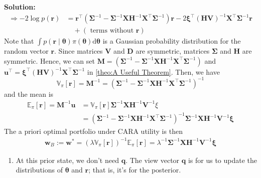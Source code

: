 \documentclass[13pt]{article}
\theoremstyle{definition}
\newenvironment{solution}
{\color{C2}\begin{framed}\begingroup\textbf{Solution:} }
  {\endgroup\end{framed}}
\theoremstyle{remark}
\newenvironment{remark}
  {\pushQED{\qed}\renewcommand{\qedsymbol}{$\triangle$}\remarkx}
  {\popQED\endremarkx}
\begin{document}
\begin{solution}
\begin{align*}
\Longrightarrow -2\log p(\bm{r}) &= \bm{r}^\top \left(\mathbf{\Sigma}^{-1} - \mathbf{\Sigma}^{-1} \mathbf{X} \mathbf{H}^{-1} \mathbf{X}^{\top} \mathbf{\Sigma}^{-1}\right) \boldsymbol{r}-2 \boldsymbol{\xi}^{\top}(\mathbf{H} \boldsymbol{V})^{-1} \mathbf{X}^{\top} \mathbf{\Sigma}^{-1} \boldsymbol{r}\\
&\quad +(\text{ terms without }\boldsymbol{r})
\end{align*}
Note that $\int p(\boldsymbol{r} \mid \boldsymbol{\theta}) \pi(\boldsymbol{\theta}) \mathrm{d} \boldsymbol{\theta}$ is a Gaussian probability distribution for the random vector $\boldsymbol{r}$. Since matrices $\mathbf{V}$ and $\mathbf{D}$ are symmetric, matrices $\mathbf{\Sigma}$ and $\mathbf{H}$ are symmetric. Hence, we can set $\mathbf{M}=\left(\mathbf{\Sigma}^{-1} - \mathbf{\Sigma}^{-1} \mathbf{X} \mathbf{H}^{-1} \mathbf{X}^{\top} \mathbf{\Sigma}^{-1}\right)$ and $\bm{u}^\top=\boldsymbol{\xi}^{\top}(\mathbf{H} \boldsymbol{V})^{-1} \mathbf{X}^{\top} \mathbf{\Sigma}^{-1}$ in \cref{theo:A Useful Theorem}. Then, we have 
$$
\mathbb{V}_\pi[\boldsymbol{r}]=\mathbf{M}^{-1}=\left(\mathbf{\Sigma}^{-1} - \mathbf{\Sigma}^{-1} \mathbf{X} \mathbf{H}^{-1} \mathbf{X}^{\top} \mathbf{\Sigma}^{-1}\right)^{-1}
$$
and the mean is
$$
\begin{aligned}
\mathbb{E}_\pi[\boldsymbol{r}] =\mathbf{M}^{-1}\bm{u} & =\mathbb{V}_\pi[\boldsymbol{r}] \mathbf{\Sigma}^{-1} \mathbf{X} \mathbf{H}^{-1} \boldsymbol{V}^{-1} \xi \\
& =\left(\mathbf{\Sigma}^{-1} - \mathbf{\Sigma}^{-1} \mathbf{X} \mathbf{H}^{-1} \mathbf{X}^{\top} \mathbf{\Sigma}^{-1}\right)^{-1} \mathbf{\Sigma}^{-1} \mathbf{X} \mathbf{H}^{-1} \boldsymbol{V}^{-1} \boldsymbol{\xi}
\end{aligned}
$$
The a priori optimal portfolio under CARA utility is then
\begin{align}
   \bm{w}_B:=\bm{w}^*=\left(\lambda \mathbb{V}_\pi[\boldsymbol{r}]\right)^{-1} \mathbb{E}_\pi[\boldsymbol{r}]=\lambda^{-1} \mathbf{\Sigma}^{-1} \mathbf{X} \mathbf{H}^{-1} \boldsymbol{V}^{-1} \boldsymbol{\xi} \label{eq:priori optimal portfolio under CARA}
\end{align}
\end{solution}

\begin{remark}
    \hfill\begin{enumerate}
        \item At this prior state, we don't need $\bm{q}$. The view vector $\bm{q}$ is for us to update the distributions of $\bm{\theta}$ and $\bm{r}$; that is, it's for the posterior.
    \end{enumerate}
\end{remark}
\end{document}

